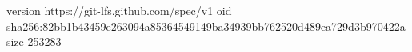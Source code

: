 version https://git-lfs.github.com/spec/v1
oid sha256:82bb1b43459e263094a85364549149ba34939bb762520d489ea729d3b970422a
size 253283

